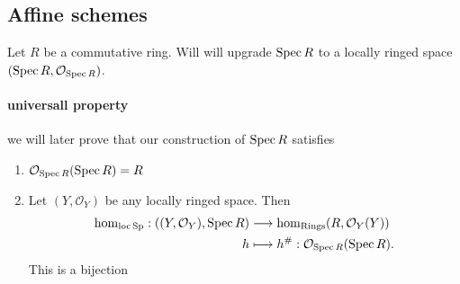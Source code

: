 \subsection{Affine schemes} \label{sec:affine_schemes}
Let $R $ be a commutative ring. Will will upgrade $\operatorname{Spec} R$ to a locally ringed space $(\operatorname{Spec} R, \mathcal{O} _{\operatorname{Spec} R})$.

\paragraph{universall property} we will later prove that our construction of $\operatorname{Spec} R$ satisfies
\begin{enumerate}
	\item $\mathcal{O} _{\operatorname{Spec} R}(\operatorname{Spec} R) = R$ 
	\item Let $(Y, \mathcal{O} _Y)$ be any locally ringed space. Then \begin{align*}
			\hom_{\operatorname{loc} \text{Sp}}: ((Y, \mathcal{O} _Y), \operatorname{Spec} R) &\longrightarrow  \hom_\text{Rings} (R, \mathcal{O} _Y(Y)) \\
				h &\longmapsto h^\# : \mathcal{O}_{\operatorname{Spec} R}(\operatorname{Spec} R) 
	.\end{align*}
	This is a bijection
\end{enumerate}

